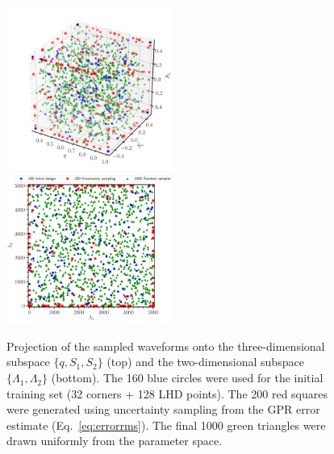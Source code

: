 \documentclass[prd,aps,letter,twocolumn,floatfix,notitlepage,nofootinbib]{revtex4-1}
\begin{document}
\begin{figure}[htb]
\centering
\includegraphics[width=0.49\textwidth]{trainingset3d.pdf}\\
\includegraphics[width=0.49\textwidth]{trainingset2d.pdf}
\caption{Projection of the sampled waveforms onto the three-dimensional subspace $\{q, S_1, S_2\}$ (top) and the two-dimensional subspace $\{\Lambda_1, \Lambda_2\}$ (bottom). The 160 blue circles were used for the initial training set (32 corners + 128 LHD points). The 200 red squares were generated using uncertainty sampling from the GPR error estimate (Eq.~\eqref{eq:errorrms}). The final 1000 green triangles were drawn uniformly from the parameter space.
}
\label{fig:LHD}
\end{figure}
\end{document}
